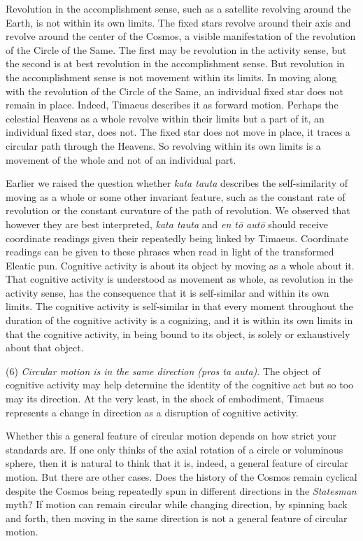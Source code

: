 Revolution in the accomplishment sense, such as a satellite revolving around the Earth, is not within its own limits. The fixed stars revolve around their axis and revolve around the center of the Cosmos, a visible manifestation of the revolution of the Circle of the Same. The first may be revolution in the activity sense, but the second is at best revolution in the accomplishment sense. But revolution in the accomplishment sense is not movement within its limits. In moving along with the revolution of the Circle of the Same, an individual fixed star does not remain in place. Indeed, Timaeus describes it as forward motion. Perhaps the celestial Heavens as a whole revolve within their limits but a part of it, an individual fixed star, does not. The fixed star does not move in place, it traces a circular path through the Heavens. So revolving within its own limits is a movement of the whole and not of an individual part.

Earlier we raised the question whether \emph{kata tauta} describes the self-similarity of moving as a whole or some other invariant feature, such as the constant rate of revolution or the constant curvature of the path of revolution. We observed that however they are best interpreted, \emph{kata tauta} and \emph{en tō autō} should receive coordinate readings given their repeatedly being linked by Timaeus. Coordinate readings can be given to these phrases when read in light of the transformed Eleatic pun. Cognitive activity is about its object by moving as a whole about it. That cognitive activity is understood as movement as whole, as revolution in the activity sense, has the consequence that it is self-similar and within its own limits. The cognitive activity is self-similar in that every moment throughout the duration of the cognitive activity is a cognizing, and it is within its own limits in that the cognitive activity, in being bound to its object, is solely or exhaustively about that object.

(6) \emph{Circular motion is in the same direction (\emph{pros ta auta})}. The object of cognitive activity may help determine the identity of the cognitive act but so too may its direction. At the very least, in the shock of embodiment, Timaeus represents a change in direction as a disruption of cognitive activity. 

Whether this a general feature of circular motion depends on how strict your standards are. If one only thinks of the axial rotation of a circle or voluminous sphere, then it is natural to think that it is, indeed, a general feature of circular motion. But there are other cases. Does the history of the Cosmos remain cyclical despite the Cosmos being repeatedly spun in different directions in the \emph{Statesman} myth? If motion can remain circular while changing direction, by spinning back and forth, then moving in the same direction is not a general feature of circular motion.

